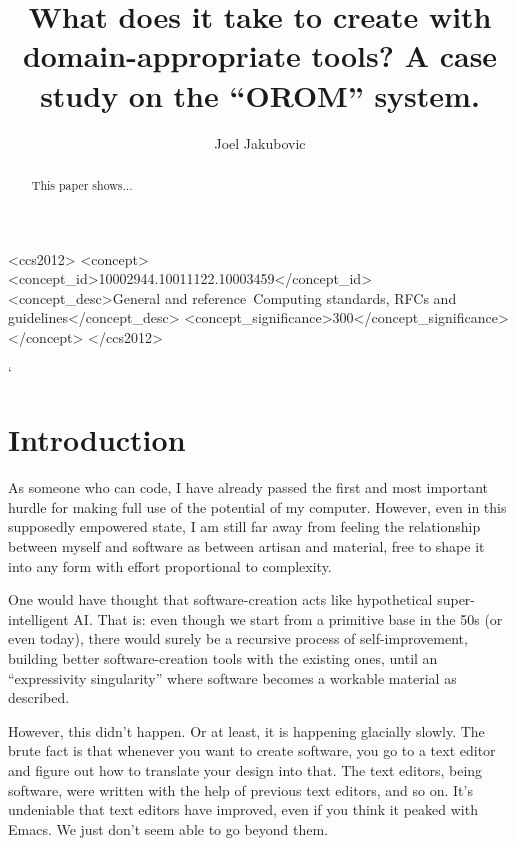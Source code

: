 \documentclass[english,submission]{programming}
\begin{document}

\title{What does it take to create with domain-appropriate tools? A case study on the ``OROM'' system.}
\author{Joel Jakubovic}


\begin{CCSXML}
<ccs2012>
<concept>
<concept_id>10002944.10011122.10003459</concept_id>
<concept_desc>General and reference~Computing standards, RFCs and guidelines</concept_desc>
<concept_significance>300</concept_significance>
</concept>
</ccs2012>
\end{CCSXML}

`

\maketitle

\begin{abstract}
  This paper shows...
\end{abstract}

\providecommand{\tightlist}{%
  \setlength{\itemsep}{0pt}\setlength{\parskip}{0pt}}

\hypertarget{introduction}{%
\section{Introduction}\label{introduction}}

As someone who can code, I have already passed the first and most
important hurdle for making full use of the potential of my computer.
However, even in this supposedly empowered state, I am still far away
from feeling the relationship between myself and software as between
artisan and material, free to shape it into any form with effort
proportional to complexity.

One would have thought that software-creation acts like hypothetical
super-intelligent AI. That is: even though we start from a primitive
base in the 50s (or even today), there would surely be a recursive
process of self-improvement, building better software-creation tools
with the existing ones, until an ``expressivity singularity'' where
software becomes a workable material as described.

However, this didn't happen. Or at least, it is happening glacially
slowly. The brute fact is that whenever you want to create software, you
go to a text editor and figure out how to translate your design into
that. The text editors, being software, were written with the help of
previous text editors, and so on. It's undeniable that text editors have
improved, even if you think it peaked with Emacs. We just don't seem
able to go beyond them.
\end{document}
